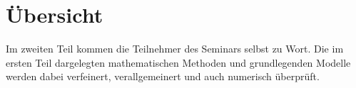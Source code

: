 %
%
%
\chapter*{Übersicht}
\label{buch:uebersicht}
Im zweiten Teil kommen die Teilnehmer des Seminars selbst zu Wort.
Die im ersten Teil dargelegten mathematischen Methoden und
grundlegenden Modelle werden dabei verfeinert, verallgemeinert
und auch numerisch überprüft.







\clearpage
\thispagestyle{empty}
\vfill
\clearpage
 
